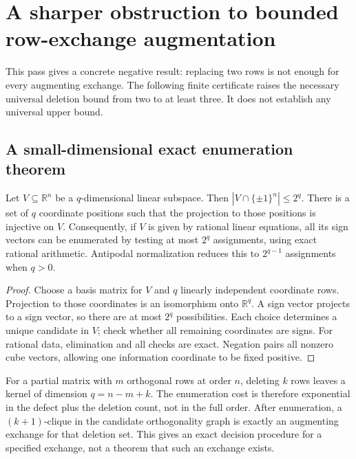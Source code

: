 
\section{A sharper obstruction to bounded row-exchange augmentation}

This pass gives a concrete negative result: replacing two rows is not
enough for every augmenting exchange. The following finite certificate
raises the necessary universal deletion bound from two to at least three.
It does not establish any universal upper bound.

\subsection{A small-dimensional exact enumeration theorem}
\begin{proposition}
Let $V\subseteq\mathbb R^n$ be a $q$-dimensional linear subspace. Then
$|V\cap\{\pm1\}^n|\le2^q$. There is a set of $q$ coordinate positions
such that the projection to those positions is injective on $V$.
Consequently, if $V$ is given by rational linear equations, all its
sign vectors can be enumerated by testing at most $2^q$ assignments,
using exact rational arithmetic. Antipodal normalization reduces this
to $2^{q-1}$ assignments when $q>0$.
\end{proposition}
\begin{proof}
Choose a basis matrix for $V$ and $q$ linearly independent coordinate
rows. Projection to those coordinates is an isomorphism onto
$\mathbb R^q$. A sign vector projects to a sign vector, so there are
at most $2^q$ possibilities. Each choice determines a unique candidate
in $V$; check whether all remaining coordinates are signs. For rational
data, elimination and all checks are exact. Negation pairs all nonzero
cube vectors, allowing one information coordinate to be fixed positive.
\end{proof}

For a partial matrix with $m$ orthogonal rows at order $n$, deleting $k$
rows leaves a kernel of dimension $q=n-m+k$. The enumeration cost is
therefore exponential in the defect plus the deletion count, not in
the full order. After enumeration, a $(k+1)$-clique in the candidate
orthogonality graph is exactly an augmenting exchange for that deletion
set. This gives an exact decision procedure for a specified exchange,
not a theorem that such an exchange exists.

